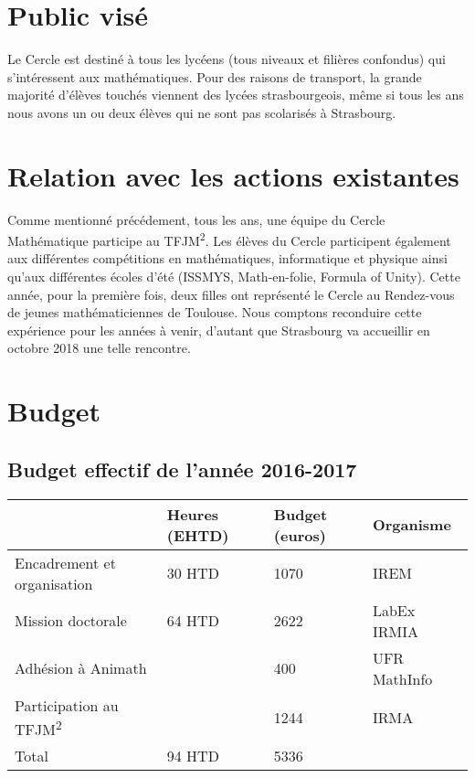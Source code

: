 \documentclass[11pt,notitlepage]{article}
\begin{document}
\section{Public vis\'e}

Le Cercle est destin\'e \`a tous les lyc\'eens (tous niveaux et fili\`eres confondus) qui s'int\'eressent aux math\'ematiques. Pour des raisons de transport, la grande majorit\'e d'\'el\`eves 
touch\'es viennent des lyc\'ees strasbourgeois, m\^eme si tous les ans nous avons un ou deux \'el\`eves qui ne sont pas scolaris\'es \`a Strasbourg. 

\section{Relation avec les actions existantes}
Comme mentionn\'e pr\'ec\'edement, tous les ans, une \'equipe du Cercle Math\'ematique participe au TFJM\textsuperscript{2}. Les \'el\`eves du Cercle participent \'egalement 
aux diff\'erentes comp\'etitions en math\'ematiques, informatique et physique ainsi qu'aux diff\'erentes \'ecoles d'\'et\'e (ISSMYS, Math-en-folie, Formula of Unity). 
Cette ann\'ee, pour la premi\`ere fois, deux filles ont repr\'esent\'e le Cercle au Rendez-vous de jeunes math\'ematiciennes de Toulouse. Nous comptons reconduire cette exp\'erience
 pour les ann\'ees \`a venir, d'autant que Strasbourg va accueillir en octobre 2018 une telle rencontre.


\section{Budget}

\subsection{Budget effectif de l'ann\'ee 2016-2017}

\begin{center}
	\begin{tabular}{|p{4 cm}|p{2cm}|p{2cm}|l|}
	\hline
	& Heures (EHTD) & Budget (euros) & Organisme\\
	\hline
	Encadrement et organisation& 30 HTD& 1070 & IREM\\
	\hline 
	Mission doctorale & 64 HTD &2622 & LabEx IRMIA\\
	\hline 
	Adh\'esion \`a Animath& & 400 & UFR MathInfo\\
	\hline
	Participation au TFJM\textsuperscript{2}& & 1244 & IRMA\\
	\hline
	Total & 94 HTD&  5336& \\
	\hline	
\end{tabular}
\end{center}
\end{document}
